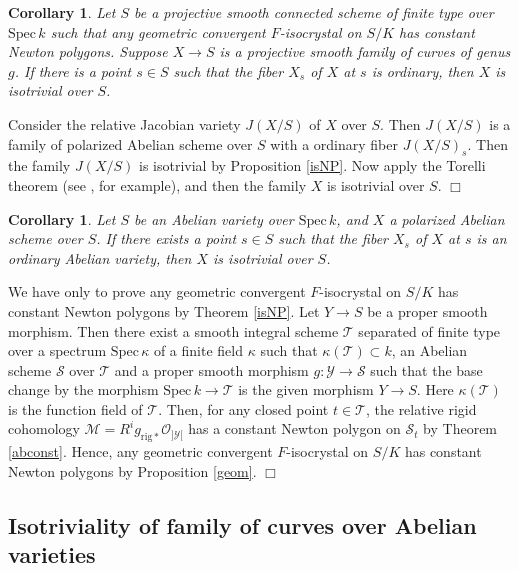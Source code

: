 \documentclass[11pt]{amsart}
\newtheorem{corollary}[Lemma]{Corollary}
\begin{document}
\begin{corollary}\label{isJNP}  Let $S$ be 
a projective smooth connected scheme of finite type over $\mathrm{Spec}\, k$ such that 
any geometric convergent $F$-isocrystal on $S/K$ has constant Newton polygons. 
Suppose $X \rightarrow S$ is a projective smooth family of curves of genus $g$.  
If there is a point $s \in S$ such that the fiber $X_s$ of $X$ at $s$ is ordinary, 
then $X$ is isotrivial over $S$. 
\end{corollary}

{ {Consider the relative Jacobian variety $J(X/S)$ of $X$ over $S$. Then $J(X/S)$ is a family of polarized Abelian scheme 
over $S$ with a ordinary fiber $J(X/S)_s$. Then the family $J(X/S)$ is isotrivial by Proposition \ref{isNP}. 
Now apply the Torelli theorem (see \cite[Theorem 12.1]{Mi}, for example), and then the family $X$ is isotrivial over $S$. 
} \hspace*{\fill} $\Box$}

\begin{corollary}\label{isocNP} Let $S$ be 
an Abelian variety over $\mathrm{Spec}\, k$, and 
$X$ a polarized Abelian scheme over $S$. 
If there exists a point $s \in S$ such that the fiber $X_s$ of $X$ at $s$ is an ordinary Abelian variety, then 
$X$ is isotrivial over $S$. 
\end{corollary}

{ {We have only to prove any geometric convergent $F$-isocrystal on $S/K$ has 
constant Newton polygons by Theorem \ref{isNP}. Let $Y \rightarrow S$ be a proper smooth morphism. 
Then there exist a smooth integral scheme $\mathcal T$ separated of finite type over a spectrum 
$\mathrm{Spec}\, \kappa$ 
of a finite field $\kappa$ such that 
$\kappa(\mathcal T) \subset k$, an Abelian scheme $\mathcal S$ over $\mathcal T$ and 
a proper smooth morphism $g : \mathcal Y \rightarrow \mathcal S$ 
such that the base change by the morphism $\mathrm{Spec}\, k \rightarrow \mathcal T$ is 
the given morphism $Y \rightarrow S$. Here $\kappa(\mathcal T)$ is the function field of $\mathcal T$. 
Then, for any closed point $t \in \mathcal T$,  
the relative rigid cohomology $\mathcal M = R^ig_{\mathrm{rig}\ast}\mathcal O_{]\mathcal Y[}$ 
has a constant Newton polygon on $\mathcal S_t$ by Theorem \ref{abconst}. 
Hence, any geometric convergent $F$-isocrystal on $S/K$ 
has constant Newton polygons by Proposition \ref{geom}. 
} \hspace*{\fill} $\Box$}

\subsection{Isotriviality of family of curves over Abelian varieties}
\end{document}
